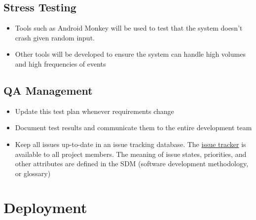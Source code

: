 \documentclass[11pt]{article}
\begin{document}
\subsection{Stress Testing}

\begin{itemize}
\item Tools such as Android Monkey will be used to test that the system doesn't crash given random input.
\item Other tools will be developed to ensure the system can handle high volumes and high frequencies of events
\end{itemize}

\subsection{QA Management}
\begin{itemize}
\item Update this test plan whenever requirements change
\item Document test results and communicate them to the entire development team
\item Keep all issues up-to-date in an issue tracking database. The \href{https://projects.neutralspace.com/projects/android/issues}{issue tracker} is available to all project members. The meaning of issue states, priorities, and other attributes are defined in the SDM (software development methodology, or glossary)
\end{itemize}

\section{Deployment}
\end{document}
